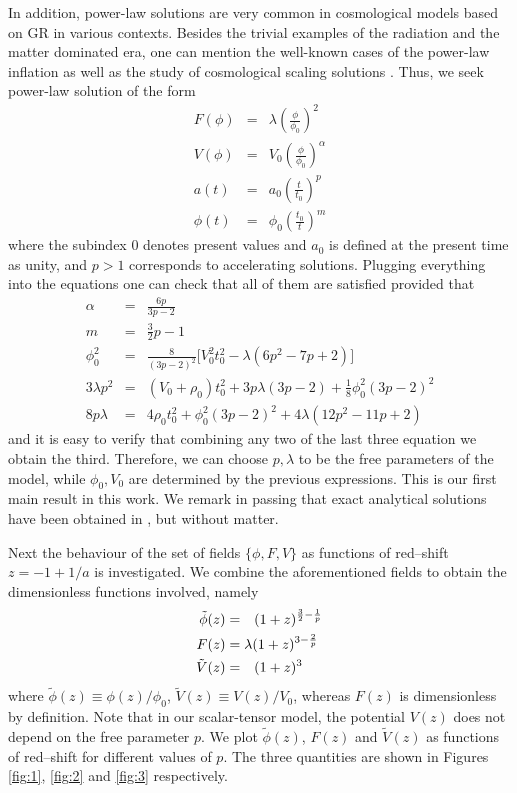 In addition, power-law solutions are very common in cosmological models based on GR in various contexts.
Besides the trivial examples of the radiation and the matter dominated era, one can mention the
well-known cases of the power-law inflation \cite{Lucchin:1984yf} as well as the study of
cosmological scaling solutions \cite{Liddle:1998xm}.
Thus,
we seek power-law solution of the form
\begin{eqnarray}
F(\phi) & = & \lambda \left(\frac{\phi}{\phi_0}\right)^2 \\
V(\phi) & = & V_0 \left(\frac{\phi}{\phi_0}\right)^\alpha \\
a(t) & = & a_0\left(\frac{t}{t_0}\right)^p \\
\phi(t) & = & \phi_0 \left(\frac{t_0}{t}\right)^m
\end{eqnarray}
where the subindex 0 denotes present values and $a_0$ is defined at the present time as unity, and $p > 1$ corresponds to accelerating solutions. Plugging everything into the equations
one can check that all of them are satisfied provided that
\begin{eqnarray}
\alpha & = & \frac{6p}{3p-2} \\
m & = & \frac{3}{2}p - 1 \\
\phi_0^2 & = & \frac{8}{(3p-2)^2} \bigg[V_0^2 t_0^2-\lambda (6p^2-7p+2) \bigg] \\
3 \lambda p^2 & = & (V_0+\rho_0) t_0^2+3 p \lambda (3p-2) + \frac{1}{8}\phi_0^2 (3p-2)^2 \\
8 p \lambda & = & 4 \rho_0 t_0^2 + \phi_0^2 (3p-2)^2 + 4 \lambda (12p^2-11p+2)
\end{eqnarray}
%
and it is easy to verify that combining any two of the last three equation we obtain the third. Therefore, we can choose $p,\lambda$ to be the free parameters of the model, while $\phi_0,V_0$ are determined by the previous expressions. This is our first main result in this work. We remark in passing that exact analytical solutions have been obtained in \cite{exact}, but without matter. 

Next the behaviour of the set of fields $\{\phi, F, V\}$ as functions of red--shift $z=-1+1/a$ is investigated. We combine the aforementioned fields to obtain the dimensionless functions involved, namely
\begin{align}
\tilde{\phi}(z)  & = \hspace{0.25cm} (1+z)^{\frac{3}{2}-\frac{1}{p}}
\\
F(z) &= \lambda (1+z)^{3-\frac{2}{p}}
\\
\tilde{V}(z) & =  \hspace{0.25cm} (1+z)^3
\end{align}
where $\tilde{\phi}(z) \equiv \phi(z)/\phi_0 $, $\tilde{V}(z) \equiv V(z)/V_0$, whereas $F(z)$ is dimensionless by definition.  Note that in our scalar-tensor model, the potential $V(z)$ does not depend on the free parameter $p$. We plot $\tilde{\phi}(z)$, $F(z)$ and $\tilde{V}(z)$ as functions of red--shift for different values of $p$. The three quantities are shown in Figures \ref{fig:1},  \ref{fig:2} and  \ref{fig:3} respectively.


